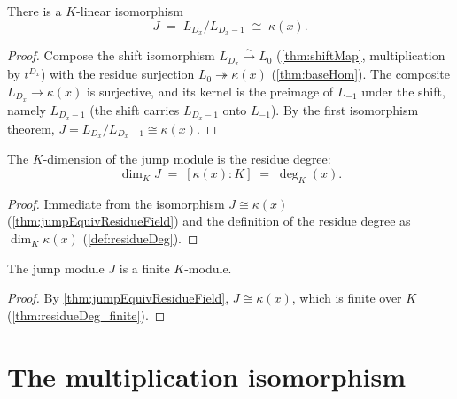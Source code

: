 \begin{theorem}
  \label{thm:jumpEquivResidueField}
  \leanok
  There is a \(K\)-linear isomorphism
  \[
    J \;=\; L_{D_x}\big/L_{D_x - 1} \;\cong\; \kappa(x).
  \]
\end{theorem}
\begin{proof}
  \leanok
  Compose the shift isomorphism \(L_{D_x} \xrightarrow{\sim} L_0\) (\ref{thm:shiftMap},
  multiplication by \(t^{D_x}\)) with the residue surjection \(L_0 \twoheadrightarrow \kappa(x)\)
  (\ref{thm:baseHom}). The composite \(L_{D_x} \to \kappa(x)\) is surjective, and its kernel is the
  preimage of \(L_{-1}\) under the shift, namely \(L_{D_x - 1}\) (the shift carries \(L_{D_x-1}\)
  onto \(L_{-1}\)). By the first isomorphism theorem, \(J = L_{D_x}/L_{D_x-1} \cong \kappa(x)\).
\end{proof}

\begin{theorem}
  \label{thm:finrank_jumpModule}
  \leanok
  The \(K\)-dimension of the jump module is the residue degree:
  \[
    \dim_K J \;=\; [\kappa(x):K] \;=\; \deg_K(x).
  \]
\end{theorem}
\begin{proof}
  \leanok
  Immediate from the isomorphism \(J \cong \kappa(x)\) (\ref{thm:jumpEquivResidueField}) and the
  definition of the residue degree as \(\dim_K \kappa(x)\) (\ref{def:residueDeg}).
\end{proof}

\begin{corollary}
  \label{cor:moduleFinite_jumpModule}
  \leanok
  The jump module \(J\) is a finite \(K\)-module.
\end{corollary}
\begin{proof}
  \leanok
  By \ref{thm:jumpEquivResidueField}, \(J \cong \kappa(x)\), which is finite over \(K\)
  (\ref{thm:residueDeg_finite}).
\end{proof}

\section{The multiplication isomorphism}

